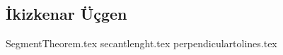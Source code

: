 \subsection{İkizkenar Üçgen}
{SegmentTheorem.tex}
\newpage
{secantlenght.tex}
\newpage
{perpendiculartolines.tex}
\newpage
